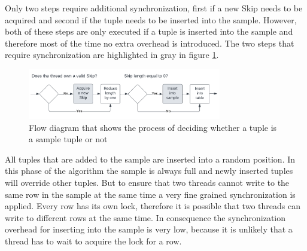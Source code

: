 \documentclass[sigconf,nonacm]{acmart}
\begin{document}
        Only two steps require additional synchronization, first if a new Skip needs to be acquired and second if the tuple needs to be inserted into the sample. However, both of these steps are only executed if a tuple is inserted into the sample and therefore most of the time no extra overhead is introduced. The two steps that require synchronization are highlighted in gray in figure \ref{fig:inserting}.
        \begin{figure}[H]
            \includegraphics[height=2.2cm]{figure3.pdf}
            \caption{Flow diagram that shows the process of deciding whether a tuple is a sample tuple or not}
            \label{fig:inserting}
        \end{figure}        

        All tuples that are added to the sample are inserted into a random position. In this phase of the algorithm the sample is always full and newly inserted tuples will override other tuples. But to ensure that two threads cannot write to the same row in the sample at the same time a very fine grained synchronization is applied. Every row has its own lock, therefore it is possible that two threads can write to different rows at the same time. In consequence the synchronization overhead for inserting into the sample is very low, because it is unlikely that a thread has to wait to acquire the lock for a row. 
\end{document}
